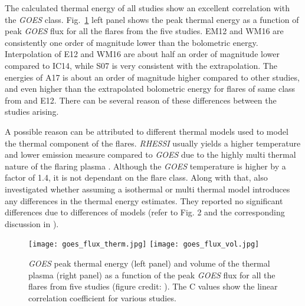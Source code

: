 The calculated thermal energy of all studies show an excellent correlation with the {\it GOES} class. Fig.~\ref{fig:goes-therm} left panel shows the peak thermal energy as a function of peak {\it GOES} flux for all the flares from the five studies. EM12 and WM16 are consistently one order of magnitude lower than the bolometric energy. Interpolation of E12 and WM16 are about half an order of magnitude lower compared to IC14, while S07 is very consistent with the extrapolation. The energies of A17 is about an order of magnitude higher compared to other studies, and even higher than the extrapolated bolometric energy for flares of same class from \cite{kretzschmar11} and E12. There can be several reason of these differences between the studies arising.

A possible reason can be attributed to different thermal models used to model the thermal component of the flares. {\it RHESSI} usually yields a higher temperature and lower emission measure compared to {\it GOES} due to the highly multi thermal nature of the flaring plasma \citep{bataglia05,ryan14,warmuth16a}. Although the {\it GOES} temperature is higher by a factor of 1.4, it is not dependant on the flare class. Along with that, \cite{warmuth20} also investigated whether assuming a isothermal or multi thermal model introduces any differences in the thermal energy estimates. They reported no significant differences due to differences of models (refer to Fig. 2 and the corresponding discussion in \cite{warmuth20}).

\begin{figure}[ht!]
    \centering
    \texttt{[image: goes\_flux\_therm.jpg]}
    \texttt{[image: goes\_flux\_vol.jpg]}
    \caption{{\it GOES} peak thermal energy (left panel) and volume of the thermal plasma (right panel) as a function of the peak {\it GOES} flux for all the flares from five studies (figure credit: \cite{warmuth20}). The C values show the linear correlation coefficient for various studies.}
    \label{fig:goes-therm}
\end{figure}

